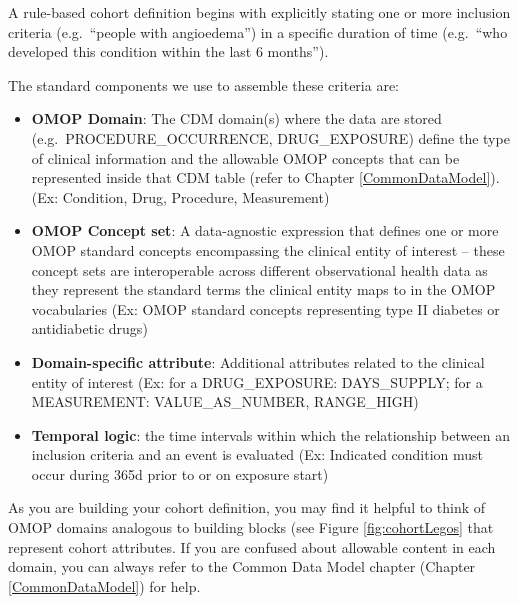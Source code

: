 \documentclass[11pt]{book}
\theoremstyle{definition}
\theoremstyle{definition}
\theoremstyle{definition}
\theoremstyle{remark}
\begin{document}
A rule-based cohort definition begins with explicitly stating one or more inclusion criteria (e.g.~``people with angioedema'') in a specific duration of time (e.g.~``who developed this condition within the last 6 months''). 

The standard components we use to assemble these criteria are:

\begin{itemize}
\item
  \textbf{OMOP Domain}: The CDM domain(s) where the data are stored (e.g.~PROCEDURE\_OCCURRENCE, DRUG\_EXPOSURE) define the type of clinical information and the allowable OMOP concepts that can be represented inside that CDM table (refer to Chapter \ref{CommonDataModel}). (Ex: Condition, Drug, Procedure, Measurement)
\item
  \textbf{OMOP Concept set}: A data-agnostic expression that defines one or more OMOP standard concepts encompassing the clinical entity of interest -- these concept sets are interoperable across different observational health data as they represent the standard terms the clinical entity maps to in the OMOP vocabularies (Ex: OMOP standard concepts representing type II diabetes or antidiabetic drugs)
\item
  \textbf{Domain-specific attribute}: Additional attributes related to the clinical entity of interest (Ex: for a DRUG\_EXPOSURE: DAYS\_SUPPLY; for a MEASUREMENT: VALUE\_AS\_NUMBER, RANGE\_HIGH)
\item
  \textbf{Temporal logic}: the time intervals within which the relationship between an inclusion criteria and an event is evaluated (Ex: Indicated condition must occur during 365d prior to or on exposure start)
\end{itemize}

As you are building your cohort definition, you may find it helpful to think of OMOP domains analogous to building blocks (see Figure \ref{fig:cohortLegos} that represent cohort attributes. If you are confused about allowable content in each domain, you can always refer to the Common Data Model chapter (Chapter \ref{CommonDataModel}) for help.
\end{document}

